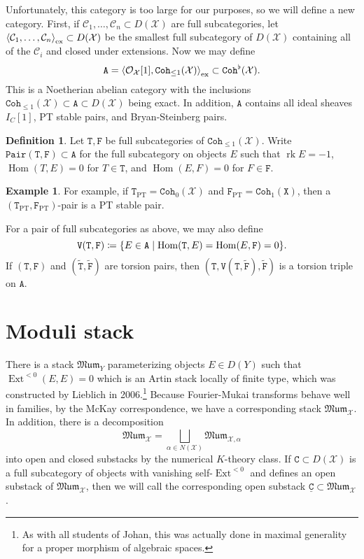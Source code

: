 \documentclass[leqno, openany]{memoir}
\theoremstyle{definition}
\newtheorem{defn}[thm]{Definition}
\newtheorem{exm}[thm]{Example}
\theoremstyle{remark}
\theoremstyle{plain}
\theoremstyle{definition}
\theoremstyle{remark}
\newcommand{\mc}[1]{\mathcal{#1}}
\newcommand{\mf}[1]{\mathfrak{#1}}
\newcommand{\mr}[1]{\mathrm{#1}}
\newcommand{\mt}[1]{\mathtt{#1}}
\newcommand{\on}[1]{\operatorname{#1}}
\newcommand{\ul}[1]{\underline{#1}}
\newcommand{\wt}[1]{\widetilde{#1}}
\DeclareMathOperator{\Hom}{Hom}
\DeclareMathOperator{\Ext}{Ext}
\begin{document}
Unfortunately, this category is too large for our purposes, so we will define a new category. First, if $\mc{C}_1, \ldots, \mc{C}_n \subset D(\mc{X})$ are full subcategories, let $\ev{\mc{C}_1, \ldots, \mc{C}_n}_{\mr{ex}} \subset D(\mc{X})$ be the smallest full subcategory of $D(\mc{X})$ containing all of the $\mc{C}_i$ and closed under extensions. Now we may define 
\[ \mt{A} = \ev{\mc{O}_{\mc{X}}[1], \mt{Coh}_{\leq 1}(\mc{X})}_{\mr{ex}} \subset \mt{Coh}^{\flat}(\mc{X}). \]
This is a Noetherian abelian category with the inclusions $\mt{Coh}_{\leq 1}(\mc{X}) \subset \mt{A} \subset D(\mc{X})$ being exact. In addition, $\mt{A}$ contains all ideal sheaves $I_C[1]$, PT stable pairs, and Bryan-Steinberg pairs.

\begin{defn}
    Let $\mt{T}, \mt{F}$ be full subcategories of $\mt{Coh}_{\leq 1}(\mc{X})$. Write $\mt{Pair(T,F)} \subset \mt{A}$ for the full subcategory on objects $E$ such that $\on{rk} E = -1$, $\Hom(T, E) = 0$ for $T \in \mt{T}$, and $\Hom(E, F) = 0$ for $F \in \mt{F}$. 
\end{defn}

\begin{exm}
    For example, if $\mt{T}_{\mr{PT}} = \mt{Coh}_0(\mc{X})$ and $\mt{F}_{\mr{PT}} = \mt{Coh}_{1}(\mt{X})$, then a $(\mt{T}_{\mr{PT}}, \mt{F}_{\mr{PT}})$-pair is a PT stable pair.
\end{exm}

For a pair of full subcategories as above, we may also define
\[ \mt{V(T,F)} \coloneqq \qty{E \in \mt{A} \mid \Hom(\mt{T}, E) = \Hom(E, \mt{F}) = 0}. \]
If $(\mt{T}, \mt{F})$ and $(\wt{\mt{T}}, \wt{\mt{F}})$ are torsion pairs, then $(\mt{T}, \mt{V(T, \wt{F})}, \wt{\mt{F}})$ is a torsion triple on $\mt{A}$.

\section{Moduli stack}

There is a stack $\mf{Mum}_Y$ parameterizing objects $E \in D(Y)$ such that $\Ext^{<0}(E, E) = 0$ which is an Artin stack locally of finite type, which was constructed by Lieblich in 2006.\footnote{As with all students of Johan, this was actually done in maximal generality for a proper morphism of algebraic spaces.} Because Fourier-Mukai transforms behave well in families, by the McKay correspondence, we have a corresponding stack $\mf{Mum}_{\mc{X}}$. In addition, there is a decomposition
\[ \mf{Mum}_{\mc{X}} = \bigsqcup_{\alpha \in N(\mc{X})} \mf{Mum}_{\mc{X}, \alpha} \]
into open and closed substacks by the numerical $K$-theory class. If $\mt{C} \subset D(\mc{X})$ is a full subcategory of objects with vanishing self-$\Ext^{<0}$ and defines an open substack of $\mf{Mum}_{\mc{X}}$, then we will call the corresponding open substack $\mt{\ul{C}} \subset \mf{Mum}_{\mc{X}}$.
\end{document}
